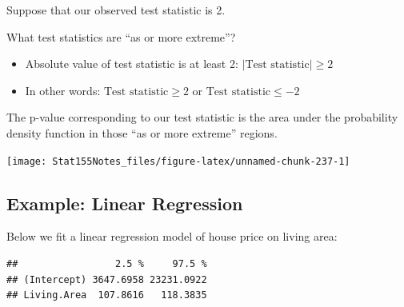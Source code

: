 \documentclass[]{book}
\newenvironment{Shaded}{\begin{snugshade}}{\end{snugshade}}
\newcommand{\CommentTok}[1]{\textcolor[rgb]{0.56,0.35,0.01}{\textit{#1}}}
\newcommand{\DataTypeTok}[1]{\textcolor[rgb]{0.13,0.29,0.53}{#1}}
\newcommand{\KeywordTok}[1]{\textcolor[rgb]{0.13,0.29,0.53}{\textbf{#1}}}
\newcommand{\NormalTok}[1]{#1}
\newcommand{\OperatorTok}[1]{\textcolor[rgb]{0.81,0.36,0.00}{\textbf{#1}}}
\newcommand{\StringTok}[1]{\textcolor[rgb]{0.31,0.60,0.02}{#1}}
\providecommand{\tightlist}{%
  \setlength{\itemsep}{0pt}\setlength{\parskip}{0pt}}
\begin{document}
Suppose that our observed test statistic is 2.

What test statistics are ``as or more extreme''?

\begin{itemize}
\tightlist
\item
  Absolute value of test statistic is at least 2: \(|\text{Test statistic}| \geq 2\)
\item
  In other words: \(\text{Test statistic} \geq 2\) or \(\text{Test statistic} \leq -2\)
\end{itemize}

The p-value corresponding to our test statistic is the area under the probability density function in those ``as or more extreme'' regions.

\begin{center}\texttt{[image: Stat155Notes\_files/figure-latex/unnamed-chunk-237-1]} \end{center}

\hypertarget{example-linear-regression}{%
\subsection{Example: Linear Regression}\label{example-linear-regression}}

Below we fit a linear regression model of house price on living area:

\begin{Shaded}
\end{Shaded}

\begin{verbatim}
##                 2.5 %     97.5 %
## (Intercept) 3647.6958 23231.0922
## Living.Area  107.8616   118.3835
\end{verbatim}

\begin{Shaded}
\end{Shaded}
\end{document}
